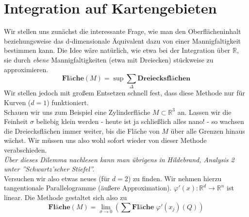 \section{Integration auf Kartengebieten}
\setcounter{equation}{0}     %
Wir stellen uns zunächst die interessante Frage, wie man den Oberflächeninhalt beziehungsweise das d-dimensionale Äquivalent dazu von einer Mannigfaltigkeit bestimmen kann. 
Die Idee wäre natürlich, wie etwa bei der Integration über $\mathbb{R}$, sie durch \emph{ebene} Mannigfaltigkeiten (etwa mit Dreiecken) stückweise zu approximieren.
\begin{equation*}
\textbf{Fläche}(M)=\sup \sum\limits_\Delta \textbf{Dreiecksflächen}
\end{equation*}
Wir stellen jedoch mit großem Entsetzen schnell fest, dass diese Methode nur für Kurven ($d=1$) funktioniert.\\
\linebreak
Schauen wir uns zum Beispiel eine Zylinderfläche $M\subset\mathbb{R}^3$ an. 
Lassen wir die Feinheit $\sigma$ beliebig klein werden - heute ist ja schließlich alles nano! - so wachsen die Dreiecksflächen immer weiter, 
bis die Fläche von $M$ über alle Grenzen hinaus wächst. Wir müssen uns also wohl sofort wieder von dieser Methode verabschieden.\\
\emph{Über dieses Dilemma nachlesen kann man übrigens in Hildebrand, Analysis 2 unter ''Schwartz'scher Stiefel''.}\\
\linebreak
Versuchen wir also etwas neues (für $d=2$) zu finden. Wir nehmen hierzu tangentionale Parallelogramme (äußere Approximation).
$\varphi'(x):\mathbb{R}^d\rightarrow\mathbb{R}^n$ ist linear. Die Methode gestaltet sich also zu
\begin{equation*}
\textbf{Fläche}(M)=\lim\limits_{\sigma\rightarrow 0}\left(\sum\textbf{Fläche\ }\varphi'(x_j)(Q)\right)
\end{equation*}